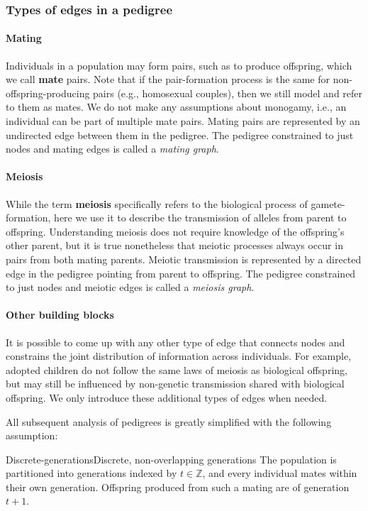 \documentclass[12pt]{article}
\numberwithin{equation}{section}
\begin{document}
\subsubsection{Types of edges in a pedigree}

\paragraph{Mating}
Individuals in a population may form pairs, such as to produce offspring, which we call \textbf{mate} pairs.
Note that if the pair-formation process is the same for non-offspring-producing pairs (e.g., homosexual couples), then we still model and refer to them as mates.
We do not make any assumptions about monogamy, i.e., an individual can be part of multiple mate pairs.
Mating pairs are represented by an undirected edge between them in the pedigree.
The pedigree constrained to just nodes and mating edges is called a \emph{mating graph}.

\paragraph{Meiosis}
While the term \textbf{meiosis} specifically refers to the biological process of gamete-formation, here we use it to describe the transmission of alleles from parent to offspring.
Understanding meiosis does not require knowledge of the offspring's other parent, but it is true nonetheless that meiotic processes always occur in pairs from both mating parents.
Meiotic transmission is represented by a directed edge in the pedigree pointing from parent to offspring.
The pedigree constrained to just nodes and meiotic edges is called a \emph{meiosis graph}.

\paragraph{Other building blocks}
It is possible to come up with any other type of edge that connects nodes and constrains the joint distribution of information across individuals.
For example, adopted children do not follow the same laws of meiosis as biological offspring, but may still be influenced by non-genetic transmission shared with biological offspring.
We only introduce these additional types of edges when needed.

All subsequent analysis of pedigrees is greatly simplified with the following assumption:

\begin{assumption}{Discrete-generations}{Discrete, non-overlapping generations}
The population is partitioned into generations indexed by $t \in \mathbb{Z}$, and every individual mates within their own generation.
Offspring produced from such a mating are of generation $t+1$.
\end{assumption}
\end{document}
